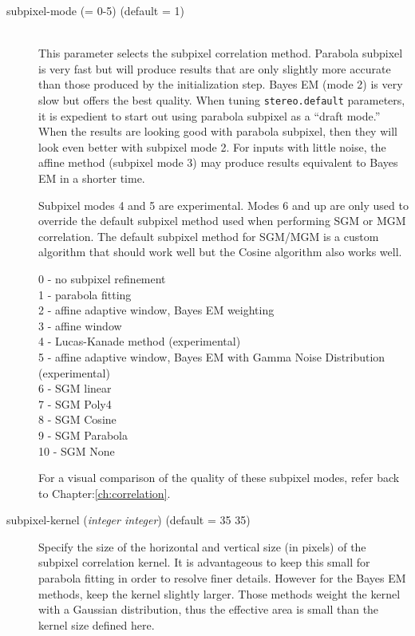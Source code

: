 \begin{description}

\item[subpixel-mode \textnormal{\small{(= 0-5)}} (default = 1)] \hfill \\
  This parameter selects the subpixel correlation method. Parabola subpixel
  is very fast but will produce results that are only slightly more accurate
   than those produced by the initialization step. Bayes EM (mode 2)
  is very slow but offers the best quality. When tuning {\tt stereo.default}
  parameters, it is expedient to start out using parabola subpixel as a
  ``draft mode.'' When the results are looking good with parabola subpixel,
  then they  will look even better with subpixel mode 2.  For inputs with
  little noise, the affine method (subpixel mode 3) may produce results
  equivalent to Bayes EM in a shorter time.
  
  Subpixel modes 4 and 5 are experimental.  Modes 6 and up are only used to
  override the default subpixel method used when performing SGM or MGM 
  correlation.  The default subpixel method for SGM/MGM is a custom 
  algorithm that should work well but the Cosine algorithm also works well.

  \begin{description}
    \item[0 - no subpixel refinement]
    \item[1 - parabola fitting ]
    \item[2 - affine adaptive window, Bayes EM weighting ]
    \item[3 - affine window ]
    \item[4 - Lucas-Kanade method (experimental)]
    \item[5 - affine adaptive window, Bayes EM with Gamma Noise Distribution (experimental) ]
    \item[6 - SGM linear ]
    \item[7 - SGM Poly4 ]
    \item[8 - SGM Cosine ]
    \item[9 - SGM Parabola ]
    \item[10 - SGM None ]
  \end{description}

  For a visual comparison of the quality of these subpixel modes,
  refer back to Chapter:\ref{ch:correlation}.

\item[subpixel-kernel \textnormal{\small{(\emph{integer integer})}} (default = 35 35)]
  Specify the size of the horizontal and vertical size (in pixels) of
  the subpixel correlation kernel. It is advantageous to keep this
  small for parabola fitting in order to resolve finer
  details. However for the Bayes EM methods, keep the kernel slightly
  larger. Those methods weight the kernel with a Gaussian
  distribution, thus the effective area is small than the kernel size
  defined here.

\end{description}

